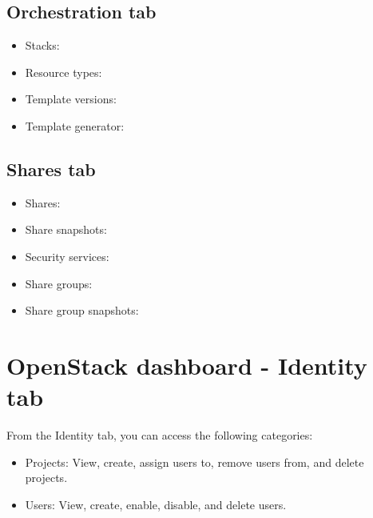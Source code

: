 \subsection*{\texorpdfstring{Orchestration
tab}{Orchestration tab}}\label{orchestration-tab}

\begin{itemize}
\item
  Stacks:
\item
  Resource types:
\item
  Template versions:
\item
  Template generator:
\end{itemize}

\subsection*{\texorpdfstring{Shares
tab}{Shares tab}}\label{shares-tab}

\begin{itemize}
\item
  Shares:
\item
  Share snapshots:
\item
  Security services:
\item
  Share groups:
\item
  Share group snapshots:
\end{itemize}

\section*{OpenStack dashboard - Identity
tab}\label{openstack-dashboard---identity-tab}

From the Identity tab, you can access the following categories:

\begin{itemize}
\item
  Projects: View, create, assign users to, remove users from, and delete
  projects.
\item
  Users: View, create, enable, disable, and delete users.
\end{itemize}

